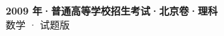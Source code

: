 \documentclass[zihao=-4, a4paper]{ctexart}
\begin{document}
\begin{center}
  {\Large\bfseries 2009 年·普通高等学校招生考试·北京卷·理科}\\[4pt]
  {\large 数学 · 试题版}
\end{center}
\medskip
{}

\end{document}
